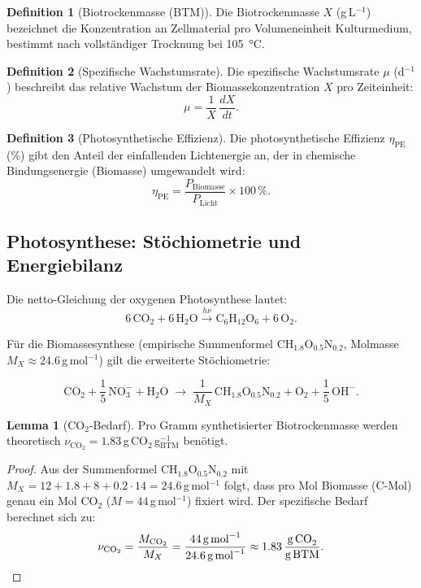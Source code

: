 ﻿\documentclass[a4paper,12pt]{article}
\theoremstyle{definition}
\newtheorem{definition}{Definition}
\newtheorem{lemma}{Lemma}
\begin{document}
\begin{definition}[Biotrockenmasse (BTM)]
	Die Biotrockenmasse $X$ (g\,L$^{-1}$) bezeichnet die Konzentration an Zellmaterial
	pro Volumeneinheit Kulturmedium, bestimmt nach vollständiger Trocknung bei 105\, °C.
\end{definition}

\begin{definition}[Spezifische Wachstumsrate]
	Die spezifische Wachstumsrate $\mu$ (d$^{-1}$) beschreibt das relative Wachstum der
	Biomassekonzentration $X$ pro Zeiteinheit:
	\[
		\mu = \frac{1}{X}\,\frac{dX}{dt}.
	\]
\end{definition}

\begin{definition}[Photosynthetische Effizienz]
	Die photosynthetische Effizienz $\eta_\mathrm{PE}$ (\%) gibt den Anteil der einfallenden
	Lichtenergie an, der in chemische Bindungsenergie (Biomasse) umgewandelt wird:
	\[
		\eta_\mathrm{PE} = \frac{P_\mathrm{Biomasse}}{P_\mathrm{Licht}} \times 100\,\%.
	\]
\end{definition}

\subsection{Photosynthese: Stöchiometrie und Energiebilanz}

Die netto-Gleichung der oxygenen Photosynthese lautet:
\[
	6\,\mathrm{CO}_2 + 6\,\mathrm{H}_2\mathrm{O}
	\xrightarrow{h\nu}
	\mathrm{C}_6\mathrm{H}_{12}\mathrm{O}_6 + 6\,\mathrm{O}_2.
\]

Für die Biomassesynthese (empirische Summenformel $\mathrm{CH}_{1.8}\mathrm{O}_{0.5}\mathrm{N}_{0.2}$,
Molmasse $M_X \approx 24.6$\,g\,mol$^{-1}$) gilt die erweiterte Stöchiometrie:

\begin{equation}
	\mathrm{CO}_2 + \frac{1}{5}\,\mathrm{NO}_3^- + \mathrm{H}_2\mathrm{O}
	\;\longrightarrow\;
	\frac{1}{M_X}\,\mathrm{C}\mathrm{H}_{1.8}\mathrm{O}_{0.5}\mathrm{N}_{0.2}
	+ \mathrm{O}_2 + \frac{1}{5}\,\mathrm{OH}^-.
	\label{eq:stoech}
\end{equation}

\begin{lemma}[$\mathrm{CO}_2$-Bedarf]
	Pro Gramm synthetisierter Biotrockenmasse werden theoretisch
	$\nu_{\mathrm{CO}_2} = 1.83$\,g\,\(\mathrm{CO}_2\)\,g$^{-1}_\mathrm{BTM}$ benötigt.
\end{lemma}

\begin{proof}
	Aus der Summenformel $\mathrm{CH}_{1.8}\mathrm{O}_{0.5}\mathrm{N}_{0.2}$ mit
	$M_X = 12 + 1.8 + 8 + 0.2 \cdot 14 = 24.6$\,g\,mol$^{-1}$ folgt, dass
	pro Mol Biomasse (C-Mol) genau ein Mol $\mathrm{CO}_2$ ($M = 44$\,g\,mol$^{-1}$)
	fixiert wird. Der spezifische Bedarf berechnet sich zu:
	\[
		\nu_{\mathrm{CO}_2}
		= \frac{M_{\mathrm{CO}_2}}{M_X}
		= \frac{44\,\text{g\,mol}^{-1}}{24.6\,\text{g\,mol}^{-1}}
		\approx 1.83\,\frac{\text{g\,CO}_2}{\text{g\,BTM}}.
	\]
\end{proof}
\end{document}

